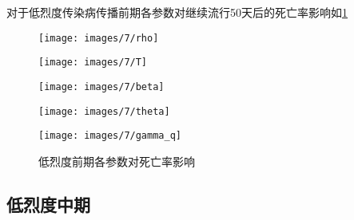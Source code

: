 \documentclass[withoutpreface,bwprint]{cumcmthesis}
\begin{document}
对于低烈度传染病传播前期各参数对继续流行50天后的死亡率影响如\cref{fig:12}
\begin{figure}[H]
    \centering
    \begin{minipage}[c]{0.3\textwidth}
        \centering
        \texttt{[image: images/7/rho]}
        \subcaption{$\rho$}
    \end{minipage}
    \begin{minipage}[c]{0.3\textwidth}
        \centering
        \texttt{[image: images/7/T]}
    \end{minipage}
    \begin{minipage}[c]{0.3\textwidth}
        \centering
        \texttt{[image: images/7/beta]}
        \subcaption{$\beta$}
    \end{minipage}

    \begin{minipage}[c]{0.3\textwidth}
        \centering
        \texttt{[image: images/7/theta]}
        \subcaption{$\theta$}
    \end{minipage}
    \begin{minipage}[c]{0.3\textwidth}
        \centering
        \texttt{[image: images/7/gamma\_q]}
    \end{minipage}
    \caption{低烈度前期各参数对死亡率影响}
    \label{fig:12}
    
\end{figure}

\subsection{低烈度中期}
\end{document}

